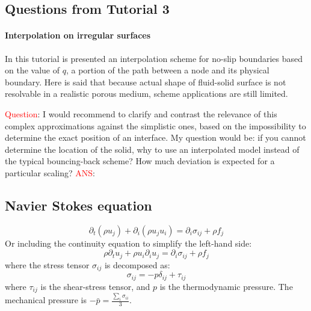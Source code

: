 \documentclass{article}
\begin{document}
	\subsection{Questions from Tutorial 3}
	
	\paragraph{Interpolation on irregular surfaces} In this tutorial is presented an interpolation scheme for no-slip boundaries based on the value of $q$, a portion of the path between a node and its physical boundary. Here is said that because actual shape of fluid-solid surface is not resolvable in a realistic porous medium, scheme applications are still limited.
	
	\textcolor{red}{Question}: I would recommend to clarify and contrast the relevance of this complex approximations against the simplistic ones, based on the impossibility to determine the exact position of an interface. My question would be: if you cannot determine the location of the solid, why to use an interpolated model instead of the typical bouncing-back scheme? How much deviation is expected for a particular scaling?
	\textcolor{red}{ANS}: 
	
	\subsection{Navier Stokes equation}
	
	\begin{equation}\label{eq:navierStokes}
		\partial_t (\rho u_j) + \partial_i (\rho u_j u_i)  = \partial_i \sigma_{ij} + \rho f_j
	\end{equation}
	Or including the continuity equation to simplify the left-hand side:
	\begin{equation}
		\rho \partial_t u_j + \rho u_i \partial_i u_j  = \partial_i \sigma_{ij} + \rho f_j
	\end{equation}
	where the stress tensor $\sigma_{ij}$ is decomposed as:
	\begin{equation*}
		\sigma_{ij} = - p \delta_{ij} + \tau_{ij}
	\end{equation*}
	where $ \tau_{ij}$ is the shear-stress tensor, and $p$ is the thermodynamic pressure. The mechanical pressure is $-\bar{p} = \frac{\sum_i \sigma_{ii}}{3}$.
	
\end{document}
